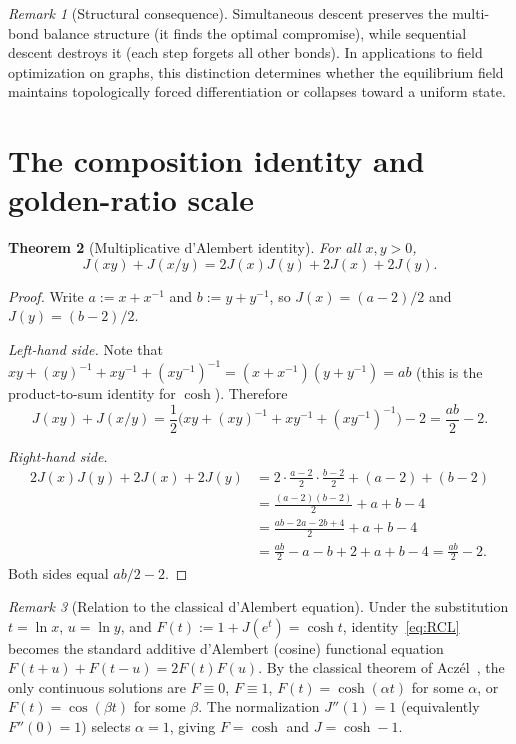 \documentclass[11pt]{amsart}
\newtheorem{theorem}{Theorem}[section]
\theoremstyle{definition}
\theoremstyle{remark}
\newtheorem{remark}[theorem]{Remark}
\begin{document}
\begin{remark}[Structural consequence]\label{rem:structure}
Simultaneous descent preserves the multi-bond balance structure
(it finds the optimal compromise), while sequential descent destroys it
(each step forgets all other bonds).  In applications to field optimization
on graphs, this distinction determines whether the equilibrium field
maintains topologically forced differentiation
or collapses toward a uniform state.
\end{remark}

\section{The composition identity and golden-ratio scale}\label{sec:composition}

\begin{theorem}[Multiplicative d'Alembert identity]\label{thm:RCL}
For all $x,y>0$,
\begin{equation}\label{eq:RCL}
J(xy)+J(x/y)=2J(x)J(y)+2J(x)+2J(y).
\end{equation}
\end{theorem}
\begin{proof}
Write $a:=x+x^{-1}$ and $b:=y+y^{-1}$, so
$J(x)=(a-2)/2$ and $J(y)=(b-2)/2$.

\textit{Left-hand side.}
Note that $xy+(xy)^{-1}+xy^{-1}+(xy^{-1})^{-1}
=(x+x^{-1})(y+y^{-1})=ab$
(this is the product-to-sum identity for $\cosh$).
Therefore
\[
J(xy)+J(x/y)
=\frac12\bigl(xy+(xy)^{-1}+xy^{-1}+(xy^{-1})^{-1}\bigr)-2
=\frac{ab}{2}-2.
\]

\textit{Right-hand side.}
\begin{align*}
2J(x)J(y)+2J(x)+2J(y)
&=2\cdot\frac{a-2}{2}\cdot\frac{b-2}{2}+(a-2)+(b-2) \\
&=\frac{(a-2)(b-2)}{2}+a+b-4 \\
&=\frac{ab-2a-2b+4}{2}+a+b-4 \\
&=\frac{ab}{2}-a-b+2+a+b-4
=\frac{ab}{2}-2.
\end{align*}
Both sides equal $ab/2-2$.
\end{proof}

\begin{remark}[Relation to the classical d'Alembert equation]\label{rem:dalembert}
Under the substitution $t=\ln x$, $u=\ln y$, and
$F(t):=1+J(e^t)=\cosh t$, identity~\eqref{eq:RCL} becomes the standard
additive d'Alembert (cosine) functional equation
$F(t+u)+F(t-u)=2F(t)F(u)$.
By the classical theorem of Acz\'el~\cite[Chapter~3]{AczelDhombres},
the only continuous solutions are $F\equiv0$, $F\equiv1$,
$F(t)=\cosh(\alpha t)$ for some $\alpha$, or
$F(t)=\cos(\beta t)$ for some $\beta$.
The normalization $J''(1)=1$ (equivalently $F''(0)=1$) selects
$\alpha=1$, giving $F=\cosh$ and $J=\cosh-1$.
\end{remark}
\end{document}
